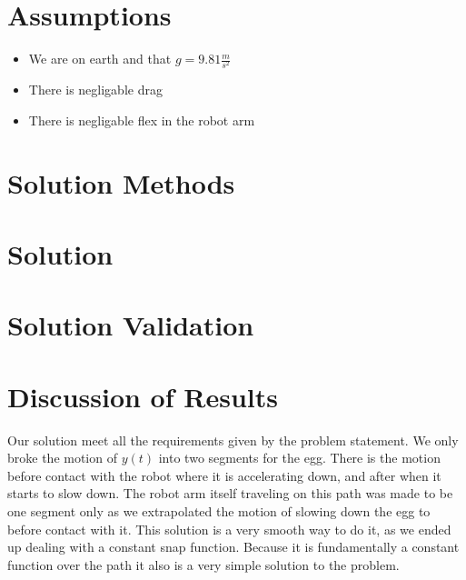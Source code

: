 \documentclass[nofoot,pdf-a,balance,upint,subscriptcorrection,varvw,mathalfa=cal=boondoxo]{asmeconf}
\begin{document}
		\section*{Assumptions}
	
	\begin{itemize}
		\item We are on earth and that $g = 9.81 \frac{m}{s^2}$
		\item There is negligable drag
		\item There is negligable flex in the robot arm
	\end{itemize}

	\section*{Solution Methods}
	
	\section*{Solution}
	
	\section*{Solution Validation}
	
	\section*{Discussion of Results}
	
	\tab Our solution meet all the requirements given by the problem statement. We only broke the motion of $y\left(t\right)$ into two segments for the egg. There is the motion before contact with the robot where it is accelerating down, and after when it starts to slow down. The robot arm itself traveling on this path was made to be one segment only as we extrapolated the motion of slowing down the egg to before contact with it. This solution is a very smooth way to do it, as we ended up dealing with a constant snap function. Because it is fundamentally a constant function over the path it also is a very simple solution to the problem.
	
\end{document}
